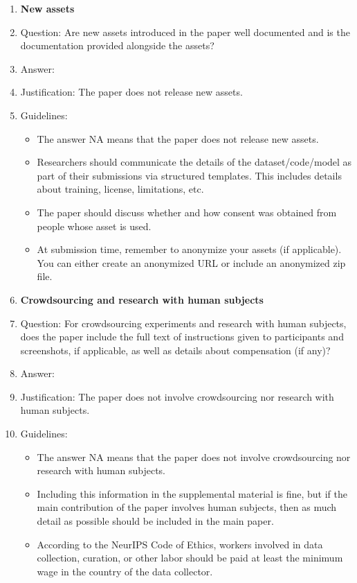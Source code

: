\documentclass{article}
\theoremstyle{plain}
\theoremstyle{definition}
\theoremstyle{remark}
\begin{document}
\begin{enumerate}
\item {\bf New assets}
    \item[] Question: Are new assets introduced in the paper well documented and is the documentation provided alongside the assets?
    \item[] Answer: \answerNA{} %
    \item[] Justification: The paper does not release new assets.
    \item[] Guidelines:
    \begin{itemize}
        \item The answer NA means that the paper does not release new assets.
        \item Researchers should communicate the details of the dataset/code/model as part of their submissions via structured templates. This includes details about training, license, limitations, etc. 
        \item The paper should discuss whether and how consent was obtained from people whose asset is used.
        \item At submission time, remember to anonymize your assets (if applicable). You can either create an anonymized URL or include an anonymized zip file.
    \end{itemize}

\item {\bf Crowdsourcing and research with human subjects}
    \item[] Question: For crowdsourcing experiments and research with human subjects, does the paper include the full text of instructions given to participants and screenshots, if applicable, as well as details about compensation (if any)? 
    \item[] Answer: \answerNA{} %
    \item[] Justification: The paper does not involve crowdsourcing nor research with human subjects.
    \item[] Guidelines:
    \begin{itemize}
        \item The answer NA means that the paper does not involve crowdsourcing nor research with human subjects.
        \item Including this information in the supplemental material is fine, but if the main contribution of the paper involves human subjects, then as much detail as possible should be included in the main paper. 
        \item According to the NeurIPS Code of Ethics, workers involved in data collection, curation, or other labor should be paid at least the minimum wage in the country of the data collector. 
    \end{itemize}


\end{enumerate}
\end{document}
